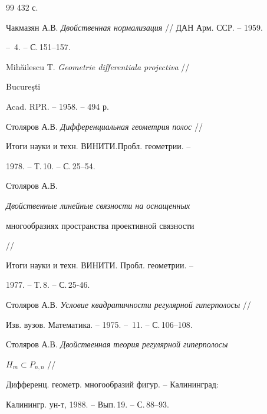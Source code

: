 \begin{thebibliography}{99}
432 с. 




Чакмазян А.В. {\em Двойственная нормализация} // ДАН Арм. ССР. -- 1959.  


-- \No\,4. -- С.\,151--157. 




Mih\u{a}ilescu T. {\em Geometrie differentiala projectiva} // 


Bucure\c{s}ti 


Acad. RPR. -- 1958. -- 494 р. 




Столяров А.В. {\em Дифференциальная геометрия полос} // 


Итоги науки и техн. ВИНИТИ.\linebreak Пробл. геометрии. -- 


1978. -- Т.\,10. -- С.\,25--54. 




Столяров А.В. {\em Двойственные линейные связности на оснащенных  


многообразиях пространства проективной связности} // 


Итоги науки и техн. ВИНИТИ. Пробл. геометрии. -- 


1977. -- Т.\,8. -- С.\,25-46. 




Столяров А.В. {\em Условие квадратичности регулярной гиперполосы} // 


Изв. вузов. Математика. -- 1975. -- \No\,11. -- С.\,106--108. 




Столяров А.В. {\em Двойственная теория регулярной гиперполосы} 


$H_m\subset P_{n,n}$ // 


Дифференц. геометр. многообразий фигур. -- Калининград: 


Калинингр. ун-т, 1988. -- Вып.\,19. -- С.\,88--93. 


 


\end{thebibliography} 


 


\vskip 1cm 


 






 


\label{end} 


 


